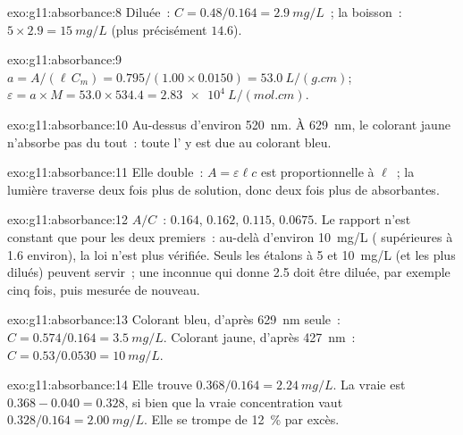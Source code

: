 \begin{solution}{exo:g11:absorbance:8}
Diluée~: $C = 0.48 / 0.164 = \qty{2.9}{mg/L}$~; la boisson~:
$5 \times 2.9 = \qty{15}{mg/L}$ (plus précisément $14.6$).
\end{solution}

\begin{solution}{exo:g11:absorbance:9}
$a = A / (\ell\, C_m) = 0.795 / (1.00 \times 0.0150) = \qty{53.0}{L/(g.cm)}$;
$\varepsilon = a \times M = 53.0 \times 534.4 = \qty{2.83e4}{L/(mol.cm)}$.
\end{solution}

\begin{solution}{exo:g11:absorbance:10}
Au-dessus d'environ \qty{520}{nm}. À \qty{629}{nm}, le colorant jaune
n'absorbe pas du tout~: toute l' y est due au colorant bleu.
\end{solution}

\begin{solution}{exo:g11:absorbance:11}
Elle double~: $A = \varepsilon \ell c$ est proportionnelle à $\ell$~; la
lumière traverse deux fois plus de solution, donc deux fois plus de
 absorbantes.
\end{solution}

\begin{solution}{exo:g11:absorbance:12}
$A/C$~: $0.164$, $0.162$, $0.115$, $0.0675$. Le rapport n'est constant
que pour les deux premiers~: au-delà d'environ \qty{10}{mg/L}
( supérieures à 1.6 environ), la loi n'est plus vérifiée.
Seuls les étalons à 5 et \qty{10}{mg/L} (et les plus dilués) peuvent
servir~; une inconnue qui donne 2.5 doit être diluée, par exemple cinq
fois, puis mesurée de nouveau.
\end{solution}

\begin{solution}{exo:g11:absorbance:13}
Colorant bleu, d'après \qty{629}{nm} seule~: $C = 0.574 / 0.164 = \qty{3.5}{mg/L}$.
Colorant jaune, d'après \qty{427}{nm}~: $C = 0.53 / 0.0530 = \qty{10}{mg/L}$.
\end{solution}

\begin{solution}{exo:g11:absorbance:14}
Elle trouve $0.368 / 0.164 = \qty{2.24}{mg/L}$. La vraie  est
$0.368 - 0.040 = 0.328$, si bien que la vraie concentration vaut
$0.328 / 0.164 = \qty{2.00}{mg/L}$. Elle se trompe de
\qty{12}{\percent} par excès.
\end{solution}

